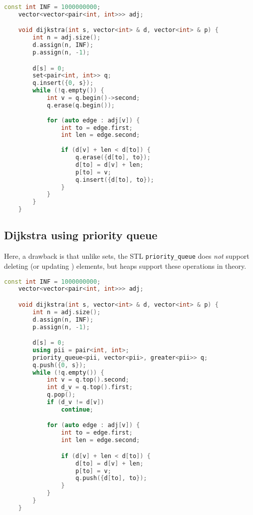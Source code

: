 \documentclass[12pt,a4paper]{amsart}
\numberwithin{equation}{section}
\theoremstyle{definition}
\begin{document}
\begin{lstlisting}[language=C++]
    const int INF = 1000000000;
    vector<vector<pair<int, int>>> adj;

    void dijkstra(int s, vector<int> & d, vector<int> & p) {
        int n = adj.size();
        d.assign(n, INF);
        p.assign(n, -1);

        d[s] = 0;
        set<pair<int, int>> q;
        q.insert({0, s});
        while (!q.empty()) {
            int v = q.begin()->second;
            q.erase(q.begin());
    
            for (auto edge : adj[v]) {
                int to = edge.first;
                int len = edge.second;
    
                if (d[v] + len < d[to]) {
                    q.erase({d[to], to});
                    d[to] = d[v] + len;
                    p[to] = v;
                    q.insert({d[to], to});
                }
            }
        }
    }
\end{lstlisting}

\subsection{Dijkstra using priority queue} Here, a drawback is that unlike sets, the STL \verb|priority_queue| does \textit{not} support deleting (or updating ) elements, but heaps support these operations in theory. 

\begin{lstlisting}[language=C++]
    const int INF = 1000000000;
    vector<vector<pair<int, int>>> adj;

    void dijkstra(int s, vector<int> & d, vector<int> & p) {
        int n = adj.size();
        d.assign(n, INF);
        p.assign(n, -1);

        d[s] = 0;
        using pii = pair<int, int>;
        priority_queue<pii, vector<pii>, greater<pii>> q;
        q.push({0, s});
        while (!q.empty()) {
            int v = q.top().second;
            int d_v = q.top().first;
            q.pop();
            if (d_v != d[v])
                continue;

            for (auto edge : adj[v]) {
                int to = edge.first;
                int len = edge.second;

                if (d[v] + len < d[to]) {
                    d[to] = d[v] + len;
                    p[to] = v;
                    q.push({d[to], to});
                }
            }
        }
    }
\end{lstlisting}
\end{document}

